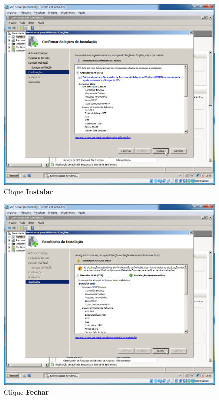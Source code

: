 \documentclass[10pt]{article}
\begin{document}
\begin{figure}[H]
    \centering
    \caption{Clique \textbf{Instalar}}
    \label{fig:IIS020}
    \includegraphics[width=\linewidth]{images/IIS/IIS020.png}
\end{figure}
\begin{figure}[H]
    \centering
    \caption{Clique \textbf{Fechar}}
    \label{fig:IIS022}
    \includegraphics[width=\linewidth]{images/IIS/IIS022.png}
\end{figure}
\end{document}
